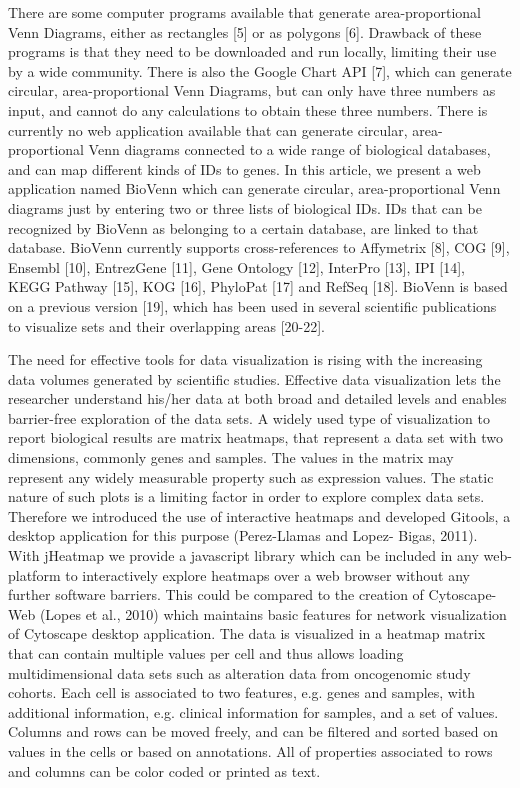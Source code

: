 \documentclass{bmcart}
\begin{document}
There are some computer programs available that generate area-proportional Venn Diagrams, either as rectangles 
[5] or as polygons [6]. Drawback of these programs is that they need to be downloaded and run locally, limiting 
their use by a wide community. There is also the Google Chart API [7], which can generate circular, area-proportional 
Venn Diagrams, but can only have three numbers as input, and cannot do any calculations to obtain these three numbers. 
There is currently no web application available that can generate circular, area-proportional Venn diagrams connected 
to a wide range of biological databases, and can map different kinds of IDs to genes. In this article, we present a 
web application named BioVenn which can generate circular, area-proportional Venn diagrams just by entering two or 
three lists of biological IDs. IDs that can be recognized by BioVenn as belonging to a certain database, are linked 
to that database. BioVenn currently supports cross-references to Affymetrix [8], COG [9], Ensembl [10], EntrezGene [11], 
Gene Ontology [12], InterPro [13], IPI [14], KEGG Pathway [15], KOG [16], PhyloPat [17] and RefSeq [18]. BioVenn is based 
on a previous version [19], which has been used in several scientific publications to visualize sets and their overlapping 
areas [20-22]. 

The need for effective tools for data visualization is rising with the
increasing data volumes generated by scientific studies. Effective
data visualization lets the researcher understand his/her data at
both broad and detailed levels and enables barrier-free exploration
of the data sets. A widely used type of visualization to report
biological results are matrix heatmaps, that represent a data set
with two dimensions, commonly genes and samples. The values in
the matrix may represent any widely measurable property such as
expression values. The static nature of such plots is a limiting
factor in order to explore complex data sets. Therefore we
introduced the use of interactive heatmaps and developed Gitools,
a desktop application for this purpose (Perez-Llamas and Lopez-
Bigas, 2011). With jHeatmap we provide a javascript library which
can be included in any web-platform to interactively explore
heatmaps over a web browser without any further software
barriers. This could be compared to the creation of Cytoscape-Web
(Lopes et al., 2010) which maintains basic features for
network visualization of Cytoscape desktop application. The
data is visualized in a heatmap matrix that can contain multiple
values per cell and thus allows loading multidimensional data sets
such as alteration data from oncogenomic study cohorts. Each cell
is associated to two features, e.g. genes and samples, with
additional information, e.g. clinical information for samples, and a
set of values. Columns and rows can be moved freely, and can be
filtered and sorted based on values in the cells or based on
annotations. All of properties associated to rows and columns can
be color coded or printed as text.
\end{document}
